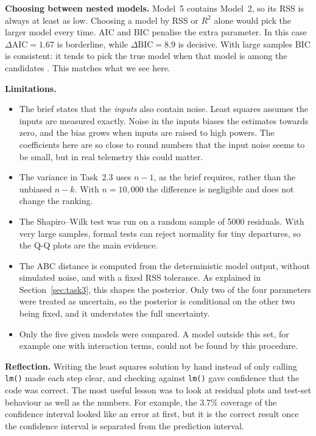 \textbf{Choosing between nested models.} Model~5 contains Model~2, so its RSS is always at least as low. Choosing a model by RSS or $R^2$ alone would pick the larger model every time. AIC and BIC penalise the extra parameter. In this case $\Delta\text{AIC}=1.67$ is borderline, while $\Delta\text{BIC}=8.9$ is decisive. With large samples BIC is consistent: it tends to pick the true model when that model is among the candidates \citep{schwarz1978,burnham2002}. This matches what we see here.

\textbf{Limitations.}
\begin{itemize}
  \item The brief states that the \emph{inputs} also contain noise. Least squares assumes the inputs are measured exactly. Noise in the inputs biases the estimates towards zero, and the bias grows when inputs are raised to high powers. The coefficients here are so close to round numbers that the input noise seems to be small, but in real telemetry this could matter.
  \item The variance in Task~2.3 uses $n-1$, as the brief requires, rather than the unbiased $n-k$. With $n=10{,}000$ the difference is negligible and does not change the ranking.
  \item The Shapiro--Wilk test was run on a random sample of 5000 residuals. With very large samples, formal tests can reject normality for tiny departures, so the Q-Q plots are the main evidence.
  \item The ABC distance is computed from the deterministic model output, without simulated noise, and with a fixed RSS tolerance. As explained in Section~\ref{sec:task3}, this shapes the posterior. Only two of the four parameters were treated as uncertain, so the posterior is conditional on the other two being fixed, and it understates the full uncertainty.
  \item Only the five given models were compared. A model outside this set, for example one with interaction terms, could not be found by this procedure.
\end{itemize}

\textbf{Reflection.} Writing the least squares solution by hand instead of only calling \texttt{lm()} made each step clear, and checking against \texttt{lm()} gave confidence that the code was correct. The most useful lesson was to look at residual plots and test-set behaviour as well as the numbers. For example, the 3.7\% coverage of the confidence interval looked like an error at first, but it is the correct result once the confidence interval is separated from the prediction interval.
